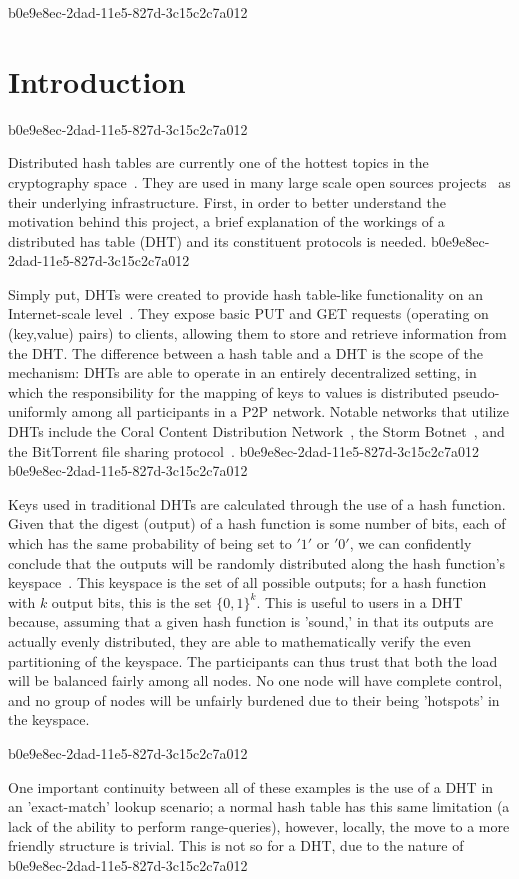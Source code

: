 \documentclass[12pt]{article}
\begin{document}
b0e9e8ec-2dad-11e5-827d-3c15c2c7a012\section{Introduction}
b0e9e8ec-2dad-11e5-827d-3c15c2c7a012\par Distributed hash tables are currently one of the hottest topics in the cryptography space~\cite{Stoica:2001dj,Rowstron:2001ea,Ratnasamy:2001wn}. They are used in many large scale open sources projects~\cite{Freitas:2013tb,Xu:2010vs,Perfitt:2010fh} as their underlying infrastructure. First, in order to better understand the motivation behind this project, a brief explanation of the workings of a distributed has table (DHT) and its constituent protocols is needed.
b0e9e8ec-2dad-11e5-827d-3c15c2c7a012
\par Simply put, DHTs were created to provide hash table-like functionality on an Internet-scale level~\cite{Ratnasamy:2001wn}. They expose basic PUT and GET requests (operating on (key,value) pairs) to clients, allowing them to store and retrieve information from the DHT. The difference between a hash table and a DHT is the scope of the mechanism: DHTs are able to operate in an entirely decentralized setting, in which the responsibility for the mapping of keys to values is distributed pseudo-uniformly among all participants in a P2P network. Notable networks that utilize DHTs include the Coral Content Distribution Network~\cite{Freedman:2004vb}, the Storm Botnet~\cite{Holz:2008uk}, and the BitTorrent file sharing protocol~\cite{Cohen:y1_8mBnw}.
b0e9e8ec-2dad-11e5-827d-3c15c2c7a012
b0e9e8ec-2dad-11e5-827d-3c15c2c7a012\par Keys used in traditional DHTs are calculated through the use of a hash function. Given that the digest (output) of a hash function is some number of bits, each of which has the same probability of being set to $'1'$ or $'0'$, we can confidently conclude that the outputs will be randomly distributed along the hash function's keyspace~. This keyspace is the set of all possible outputs; for a hash function with $k$ output bits, this is the set $\{0,1\}^k$. This is useful to users in a DHT because, assuming that a given hash function is 'sound,' in that its outputs are actually evenly distributed, they are able to mathematically verify the even partitioning of the keyspace. The participants can thus trust that both the load will be balanced fairly among all nodes. No one node will have complete control, and no group of nodes will be unfairly burdened due to their being 'hotspots' in the keyspace.~

b0e9e8ec-2dad-11e5-827d-3c15c2c7a012\par One important continuity between all of these examples is the use of a DHT in an 'exact-match' lookup scenario; a normal hash table has this same limitation (a lack of the ability to perform range-queries), however, locally, the move to a more friendly structure is trivial. This is not so for a DHT, due to the nature of
b0e9e8ec-2dad-11e5-827d-3c15c2c7a012\printbibliography
\end{document}
